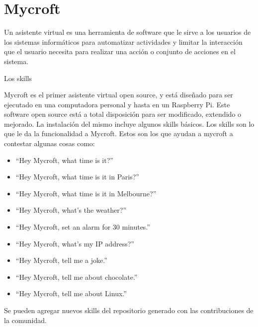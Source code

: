 \section{Mycroft}
Un asistente virtual es una herramienta de software que le sirve a los usuarios de los sistemas informáticos para automatizar actividades y limitar la interacción que el usuario necesita para realizar una acción o conjunto de acciones en el sistema. 

Los skills 

Mycroft es el primer asistente virtual open source, y está diseñado para ser ejecutado en una computadora personal y hasta en un Raspberry Pi. Este software open source está a total disposición para ser modificado, extendido o mejorado. La instalación del mismo incluye algunos skills básicos. Los skills son lo que le da la funcionalidad a Mycroft. Estos son los que ayudan a mycroft a contestar algunas cosas como:

\begin{itemize}

\item ``Hey Mycroft, what time is it?''

\item ``Hey Mycroft, what time is it in Paris?''

\item ``Hey Mycroft, what time is it in Melbourne?''

\item ``Hey Mycroft, what's the weather?''

\item ``Hey Mycroft, set an alarm for 30 minutes.''

\item ``Hey Mycroft, what's my IP address?''

\item ``Hey Mycroft, tell me a joke.''

\item ``Hey Mycroft, tell me about chocolate.''

\item ``Hey Mycroft, tell me about Linux.''

\end{itemize}

Se pueden agregar nuevos skills del repositorio generado con las contribuciones de la comunidad.~\cite{MycrofSkills}
